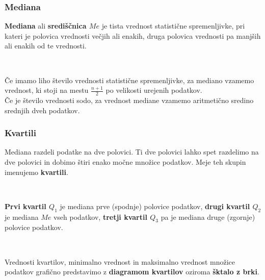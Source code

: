         
            \subsubsection{Mediana}
                \textbf{Mediana} ali \textbf{središčnica $Me$} je tista vrednost statistične spremenljivke, pri kateri je polovica vrednosti večjih ali enakih,
                druga polovica vrednosti pa manjših ali enakih od te vrednosti.                 
            
                    ~
            
                Če imamo liho število vrednosti statistične spremenljivke, za mediano vzamemo vrednost, ki stoji na mestu $\frac{n+1}{2}$ po velikosti urejenih podatkov. \\
                Če je število vrednosti sodo, za vrednost mediane vzamemo aritmetično sredino srednjih dveh podatkov.
            


            \subsubsection{Kvartili}

            
                Mediana razdeli podatke na dve polovici. Ti dve polovici lahko spet razdelimo na dve polovici in dobimo štiri enako močne množice podatkov. 
                Meje teh skupin imenujemo \textbf{kvartili}.
            
                    ~

        
                \textbf{Prvi kvartil $Q_1$} je mediana prve (spodnje) polovice podatkov, \textbf{drugi kvartil $Q_2$} je mediana $Me$ vseh podatkov,
                \textbf{tretji kvartil $Q_3$} pa je mediana druge (zgornje) polovice podatkov.
            
                    ~
            
                Vrednosti kvartilov, minimalno vrednost in maksimalno vrednost množice podatkov grafično predstavimo
                 z \textbf{diagramom kvartilov} oziroma \textbf{šktalo z brki}. \\~

